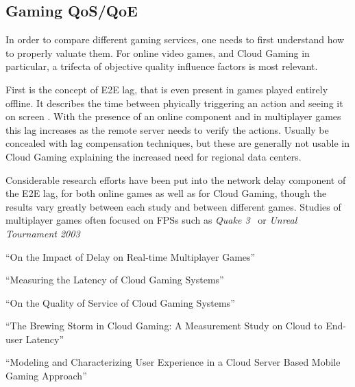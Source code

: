

\subsection{Gaming QoS/QoE}

In order to compare different gaming services, one needs to first understand how to properly valuate them. For online video games, and Cloud Gaming in particular, a trifecta of objective quality influence factors is most relevant.

First is the concept of \gls{E2E} lag, that is even present in games played entirely offline. It describes the time between phyically triggering an action and seeing it on screen \cite{metzger16lagmodel}. With the presence of an online component and in multiplayer games this lag increases as the remote server needs to verify the actions. Usually be concealed with lag compensation techniques, but these are generally not usable in Cloud Gaming explaining the increased need for regional data centers.

Considerable research efforts have been put into the network delay component of the \gls{E2E} lag, for both online games as well as for Cloud Gaming, though the results vary greatly between each study and between different games. Studies of multiplayer games often focused on \glspl{FPS} such as \textit{Quake 3}~\cite{1266180} or \textit{Unreal Tournament 2003}~\cite{Beigbeder:2004:ELL:1016540.1016556}



``On the Impact of Delay on Real-time Multiplayer Games'' \cite{Pantel:2002:IDR:507670.507674}

``Measuring the Latency of Cloud Gaming Systems'' \cite{Chen:2011:MLC:2072298.2071991}

``On the Quality of Service of Cloud Gaming Systems'' \cite{6670099}

``The Brewing Storm in Cloud Gaming: A Measurement Study on Cloud to End-user Latency'' \cite{Choy:2012:BSC:2501560.2501563}

``Modeling and Characterizing User Experience in a Cloud Server Based Mobile Gaming Approach'' \cite{5425784}



